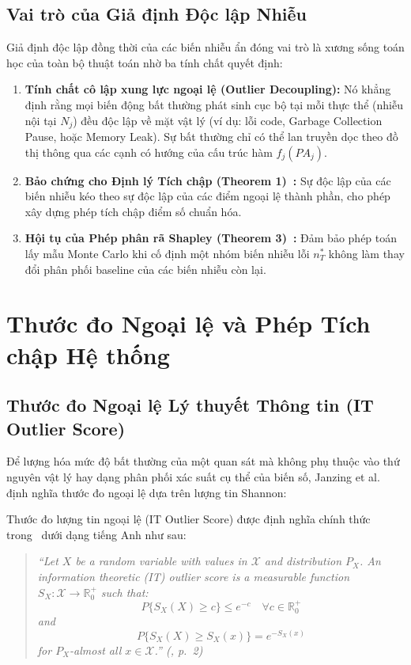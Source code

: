 \documentclass[11pt,a4paper]{article}
\begin{document}
\subsection{Vai trò của Giả định Độc lập Nhiễu}

Giả định độc lập đồng thời của các biến nhiễu ẩn đóng vai trò là xương sống toán học của toàn bộ thuật toán nhờ ba tính chất quyết định:
\begin{enumerate}
    \item \textbf{Tính chất cô lập xung lực ngoại lệ (Outlier Decoupling):} Nó khẳng định rằng mọi biến động bất thường phát sinh cục bộ tại mỗi thực thể (nhiễu nội tại $N_j$) đều độc lập về mặt vật lý (ví dụ: lỗi code, Garbage Collection Pause, hoặc Memory Leak). Sự bất thường chỉ có thể lan truyền dọc theo đồ thị thông qua các cạnh có hướng của cấu trúc hàm $f_j(PA_j)$.
    \item \textbf{Bảo chứng cho Định lý Tích chập (Theorem 1)~\cite{janzing2019rootcause}:} Sự độc lập của các biến nhiễu kéo theo sự độc lập của các điểm ngoại lệ thành phần, cho phép xây dựng phép tích chập điểm số chuẩn hóa.
    \item \textbf{Hội tụ của Phép phân rã Shapley (Theorem 3)~\cite{shapley1953,janzing2024icc}:} Đảm bảo phép toán lấy mẫu Monte Carlo khi cố định một nhóm biến nhiễu lỗi $n_T^*$ không làm thay đổi phân phối baseline của các biến nhiễu còn lại.
\end{enumerate}

\section{Thước đo Ngoại lệ và Phép Tích chập Hệ thống}

\subsection{Thước đo Ngoại lệ Lý thuyết Thông tin (IT Outlier Score)}

Để lượng hóa mức độ bất thường của một quan sát mà không phụ thuộc vào thứ nguyên vật lý hay dạng phân phối xác suất cụ thể của biến số, Janzing et al.~\cite{janzing2019rootcause} định nghĩa thước đo ngoại lệ dựa trên lượng tin Shannon:

Thước đo lượng tin ngoại lệ (IT Outlier Score) được định nghĩa chính thức trong~\cite{janzing2019rootcause} dưới dạng tiếng Anh như sau:
\begin{quote}
\itshape
``Let $X$ be a random variable with values in $\mathcal{X}$ and distribution $P_X$. An information theoretic (IT) outlier score is a measurable function $S_X : \mathcal{X} \to \mathbb{R}^+_0$ such that:
\begin{equation*}
P\{S_X(X) \ge c\} \le e^{-c} \quad \forall c \in \mathbb{R}^+_0
\end{equation*}
and
\begin{equation*}
P\{S_X(X) \ge S_X(x)\} = e^{-S_X(x)}
\end{equation*}
for $P_X$-almost all $x \in \mathcal{X}$.'' (\cite{janzing2019rootcause}, p.~2)
\end{quote}
\end{document}

